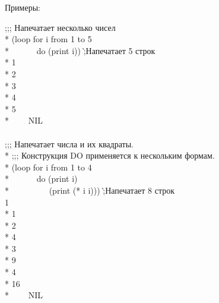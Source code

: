 \begin{defloop}
Примеры:
\begin{lisp}
;;; Напечатает несколько чисел \\*
(loop for i from 1 to 5 \\*
~~~~~~do (print i)) \`;\textrm{Напечатает 5 строк} \\*
1 \\*
2 \\*
3 \\*
4 \\*
5 \\*
~~~\EV~NIL \\
 \\
;;; Напечатает числа и их квадраты. \\*
;;; Конструкция DO применяется к нескольким формам. \\*
(loop for i from 1 to 4 \\*
~~~~~~do (print i) \\*
~~~~~~~~~(print (* i i))) \`;\textrm{Напечатает 8 строк} \\
1  \\*
1  \\*
2  \\*
4  \\*
3  \\*
9  \\*
4  \\*
16  \\*
~~~\EV~NIL
\end{lisp}
\end{defloop}


